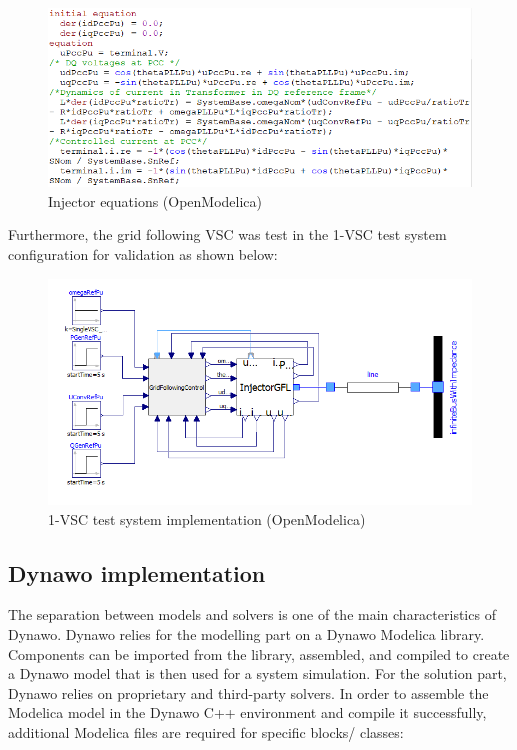 \documentclass{report}
\begin{document}
\begin{figure}[H]
    \centering
    \includegraphics[scale = 0.5]{Figure_1VSC/InjectorGFL_equations_Modelica.PNG}
    \caption{Injector equations (OpenModelica)}
    \label{fig:InjectorGFL_equations_Modelica}
\end{figure}

 Furthermore, the  grid following VSC was test in the 1-VSC test system configuration for validation as shown below:

\begin{figure}[H]
    \centering
    \includegraphics[scale = 0.5]{Figure_1VSC/1VSC_Modelica.PNG}
    \caption{1-VSC test system implementation (OpenModelica)}
    \label{fig:1VSC_Modelica}
\end{figure}


\subsection{Dynawo implementation}
The separation between models and solvers is one of the main characteristics of Dynawo. Dynawo relies for the modelling part on a Dynawo Modelica library. Components can be imported from the library, assembled, and compiled to create a Dynawo model that is then used for a system simulation. For the solution part, Dynawo relies on proprietary and third-party solvers.
In order to assemble the Modelica model in the Dynawo C++ environment and compile it successfully, additional Modelica files are required for specific blocks/ classes:
\end{document}

